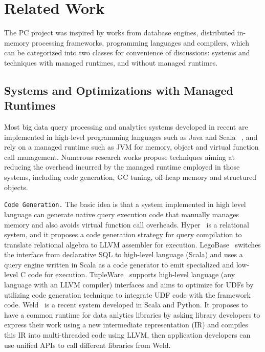 
\section{Related Work}

The PC project was inspired by works from database engines, distributed in-memory processing
frameworks,  programming languages and compilers, which can be
categorized into two classes for convenience of discussions: systems and techniques with managed
runtimes, and without managed runtimes.


\subsection {Systems and Optimizations with Managed Runtimes}

Most big data query processing and analytics
systems developed in recent are implemented in
high-level programming languages such as Java and Scala  ~\cite{dean2008mapreduce, yu2008dryadlinq,
  neumann2011efficiently, zaharia2012resilient,
  alexandrov2014stratosphere, klonatos2014building,
  crotty2015tupleware, armbrust2015spark}, and rely on a managed
runtime such as JVM for memory, object and virtual function call management. Numerous research
works propose techniques aiming at
reducing the overhead incurred by the managed runtime employed in
those systems, including code generation, GC tuning, off-heap memory and structured objects.


\vspace{5pt}
\texttt{Code Generation.} The basic idea is that a system implemented in high level language
can generate native query execution code that manually manages
memory and also avoids virtual function call
overheads. Hyper~\cite{neumann2011efficiently} is a relational system,
and it proposes a code
generation strategy for query compilation to translate relational
algebra to LLVM assembler for execution.  LegoBase~\cite{klonatos2014building} switches the interface
from declarative SQL to high-level language (Scala) and uses a query engine
written in Scala as a code generator to emit specialized and low-level
C code for execution. TupleWare~\cite{crotty2015tupleware} supports
high-level language (any language with an LLVM compiler) interfaces
and aims to
optimize for UDFs by utilizing code
generation technique to integrate UDF code with the framework
code. 
Weld~\cite{palkar2017weld} is a recent system developed in Scala and
Python. It proposes
to have a common runtime for data anlytics libraries by asking library
developers to express their work using a new intermediate
representation (IR) and compiles this IR into multi-threaded code using
LLVM, then application developers can use unified APIs to
call different libraries from Weld. 

